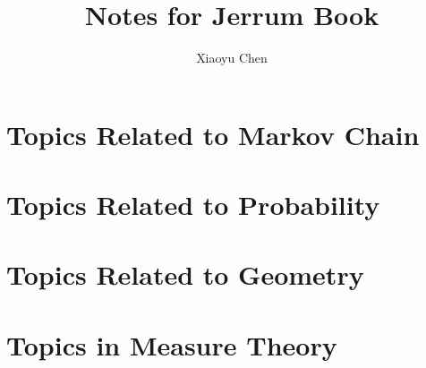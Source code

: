 \documentclass{tufte-book}
\title{\Huge Notes for Jerrum Book}
\author{Xiaoyu Chen}
\begin{document}
\maketitle
\tableofcontents
\clearpage

\chapter{Topics Related to Markov Chain}
\clearpage















\chapter{Topics Related to Probability}
\clearpage













\chapter{Topics Related to Geometry}
\clearpage







\chapter{Topics in Measure Theory}
\clearpage



\printindex
\end{document}
